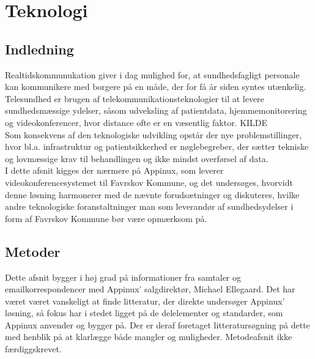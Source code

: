 \chapter{Teknologi}

\section{Indledning}

Realtidskommunukation giver i dag mulighed for, at sundhedsfagligt personale kan kommunikere med borgere på en måde, der for få år siden syntes utænkelig.
\\Telesundhed er brugen af telekommunikationsteknologier til at levere sundhedsmæssige ydelser, såsom udveksling af patientdata, hjemmemonitorering og videokonferencer, hvor distance ofte er en væsentlig faktor. KILDE\\
Som konsekvens af den teknologiske udvikling opstår der nye problemstillinger, hvor bl.a. infrastruktur og patientsikkerhed er nøglebegreber, der sætter tekniske og lovmæssige krav til behandlingen og ikke mindst overførsel af data.
\\
I dette afsnit kigges der nærmere på Appinux, som leverer videokonferencesystemet til Favrskov Kommune, og det undersøges, hvorvidt denne løsning harmonerer med de nævnte forudsætninger og diskuteres, hvilke andre teknologiske foranstaltninger man som leverandør af sundhedsydelser i form af Favrskov Kommune bør være opmærksom på.

\section{Metoder}
Dette afsnit bygger i høj grad på informationer fra samtaler og emailkorrespondencer med Appinux' salgdirektør, Michael Ellegaard. Det har været været vanskeligt at finde litteratur, der direkte undersøger Appinux' løsning, så fokus har i stedet ligget på de delelementer og standarder, som Appinux anvender og bygger på. Der er deraf foretaget litteratursøgning på dette med henblik på at klarlægge både mangler og muligheder.
Metodeafsnit ikke færdiggskrevet.

